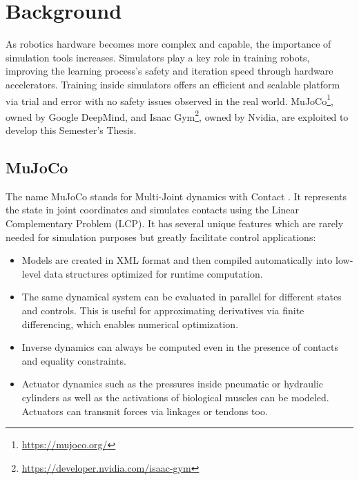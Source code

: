 \documentclass[a4paper]{article}
\begin{document}
\newpage 

\section{Background}%
As robotics hardware becomes more complex and capable, the importance of simulation tools increases. Simulators play a key role in training robots, improving the learning process's safety and iteration speed through hardware accelerators. Training inside simulators offers an efficient and scalable platform via trial and error with no safety issues observed in the real world. MuJoCo\footnote{\url{https://mujoco.org/}}, owned by Google DeepMind, and Isaac Gym\footnote{\url{https://developer.nvidia.com/isaac-gym}}, owned by Nvidia, are exploited to develop this Semester's Thesis.

\subsection{MuJoCo}

    The name MuJoCo stands for Multi-Joint dynamics with Contact \cite{6386109}. It represents the state in joint coordinates and simulates contacts using the Linear Complementary Problem (LCP). It has several unique features which are rarely needed for simulation purposes but greatly facilitate control applications:
    \begin{itemize}
        \item Models are created in XML format and then compiled automatically into low-level data structures optimized for runtime computation.
        \item The same dynamical system can be evaluated in parallel for different states and controls. This is useful for approximating derivatives via finite differencing, which enables numerical optimization.
        \item Inverse dynamics can always be computed even in the presence of contacts and equality constraints.
        \item Actuator dynamics such as the pressures inside pneumatic or hydraulic cylinders as well as the activations of biological muscles can be modeled. Actuators can transmit forces via linkages or tendons too.
    \end{itemize}
\end{document}
